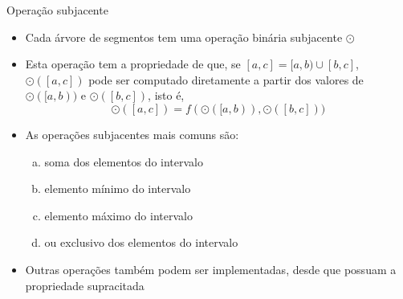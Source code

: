 \begin{frame}[fragile]{Operação subjacente}

    \begin{itemize}
        \item Cada árvore de segmentos tem uma operação binária subjacente $\odot$

        \item Esta operação tem a propriedade de que, se $[a, c] = [a, b) \cup [b, c]$, 
            $\odot([a, c])$ pode ser computado diretamente a partir dos valores de 
            $\odot([a, b))$ e $\odot([b, c])$, isto é,
            \[
                \odot([a, c]) = f(\odot([a, b)), \odot([b, c]))
            \]

        \item As operações subjacentes mais comuns são:
            \begin{enumerate}[(a)]
                \item soma dos elementos do intervalo
                \item elemento mínimo do intervalo 
                \item elemento máximo do intervalo 
                \item ou exclusivo dos elementos do intervalo
            \end{enumerate}

        \item Outras operações também podem ser implementadas, desde que possuam a propriedade
            supracitada
    \end{itemize}

\end{frame}

